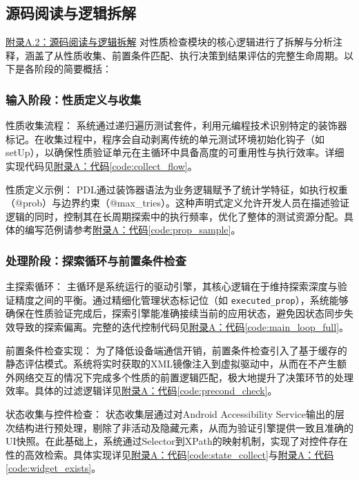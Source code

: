 \documentclass[a4paper, zihao=-4]{ctexart}
\newcommand{\bff}[1]{{\heiti #1}}
\begin{document}
\subsection{源码阅读与逻辑拆解}

\hyperref[append:2]{附录A.2：源码阅读与逻辑拆解} 对性质检查模块的核心逻辑进行了拆解与分析注释，涵盖了从性质收集、前置条件匹配、执行决策到结果评估的完整生命周期。以下是各阶段的简要概括：

\subsubsection{输入阶段：性质定义与收集}

\bff{性质收集流程}：
系统通过递归遍历测试套件，利用元编程技术识别特定的装饰器标记。在收集过程中，程序会自动剥离传统的单元测试环境初始化钩子（如setUp），以确保性质验证单元在主循环中具备高度的可重用性与执行效率。详细实现代码见\hyperref[code:collect_flow]{附录A：代码\ref{code:collect_flow}}。

\bff{性质定义示例}：
PDL通过装饰器语法为业务逻辑赋予了统计学特征，如执行权重（@prob）与边界约束（@max\_tries）。这种声明式定义允许开发人员在描述验证逻辑的同时，控制其在长周期探索中的执行频率，优化了整体的测试资源分配。具体的编写范例请参考\hyperref[code:prop_sample]{附录A：代码\ref{code:prop_sample}}。

\subsubsection{处理阶段：探索循环与前置条件检查}

\bff{主探索循环}：
主循环是系统运行的驱动引擎，其核心逻辑在于维持探索深度与验证精度之间的平衡。通过精细化管理状态标记位（如 \texttt{executed\_prop}），系统能够确保在性质验证完成后，探索引擎能准确接续当前的应用状态，避免因状态同步失效导致的探索偏离。完整的迭代控制代码见\hyperref[code:main_loop_full]{附录A：代码\ref{code:main_loop_full}}。

\bff{前置条件检查实现}：
为了降低设备端通信开销，前置条件检查引入了基于缓存的静态评估模式。系统将实时获取的XML镜像注入到虚拟驱动中，从而在不产生额外网络交互的情况下完成多个性质的前置逻辑匹配，极大地提升了决策环节的处理效率。具体的过滤逻辑详见\hyperref[code:precond_check]{附录A：代码\ref{code:precond_check}}。

\bff{状态收集与控件检查}：
状态收集层通过对Android Accessibility Service输出的层次结构进行预处理，剔除了非活动及隐藏元素，从而为验证引擎提供一致且准确的UI快照。在此基础上，系统通过Selector到XPath的映射机制，实现了对控件存在性的高效检索。具体实现详见\hyperref[code:state_collect]{附录A：代码\ref{code:state_collect}}与\hyperref[code:widget_exists]{附录A：代码\ref{code:widget_exists}}。
\end{document}

